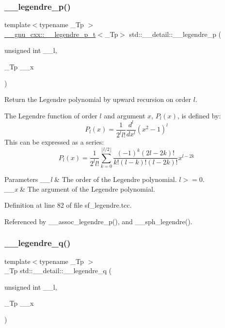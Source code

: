 \subsubsection{\texorpdfstring{\+\_\+\+\_\+legendre\+\_\+p()}{\_\_legendre\_p()}}
{\footnotesize\ttfamily template$<$typename \+\_\+\+Tp $>$ \\
\hyperlink{struct____gnu__cxx_1_1____legendre__p__t}{\+\_\+\+\_\+gnu\+\_\+cxx\+::\+\_\+\+\_\+legendre\+\_\+p\+\_\+t}$<$\+\_\+\+Tp$>$ std\+::\+\_\+\+\_\+detail\+::\+\_\+\+\_\+legendre\+\_\+p (\begin{DoxyParamCaption}\item[{unsigned int}]{\+\_\+\+\_\+l,  }\item[{\+\_\+\+Tp}]{\+\_\+\+\_\+x }\end{DoxyParamCaption})}



Return the Legendre polynomial by upward recursion on order $ l $. 

The Legendre function of order $ l $ and argument $ x $, $ P_l(x) $, is defined by\+: \[ P_l(x) = \frac{1}{2^l l!}\frac{d^l}{dx^l}(x^2 - 1)^{l} \] This can be expressed as a series\+: \[ P_l(x) = \frac{1}{2^l l!}\sum_{k=0}^{\lfloor l/2 \rfloor} \frac{(-1)^k(2l-2k)!}{k!(l-k)!(l-2k)!}x^{l-2k} \]


\begin{DoxyParams}{Parameters}
{\em \+\_\+\+\_\+l} & The order of the Legendre polynomial. $ l >= 0 $. \\
\hline
{\em \+\_\+\+\_\+x} & The argument of the Legendre polynomial. \\
\hline
\end{DoxyParams}


Definition at line 82 of file sf\+\_\+legendre.\+tcc.



Referenced by \+\_\+\+\_\+assoc\+\_\+legendre\+\_\+p(), and \+\_\+\+\_\+sph\+\_\+legendre().

\mbox{\label{namespacestd_1_1____detail_a0643760e0d1701df4db880b2ad969055}} 
\subsubsection{\texorpdfstring{\+\_\+\+\_\+legendre\+\_\+q()}{\_\_legendre\_q()}}
{\footnotesize\ttfamily template$<$typename \+\_\+\+Tp $>$ \\
\+\_\+\+Tp std\+::\+\_\+\+\_\+detail\+::\+\_\+\+\_\+legendre\+\_\+q (\begin{DoxyParamCaption}\item[{unsigned int}]{\+\_\+\+\_\+l,  }\item[{\+\_\+\+Tp}]{\+\_\+\+\_\+x }\end{DoxyParamCaption})}



